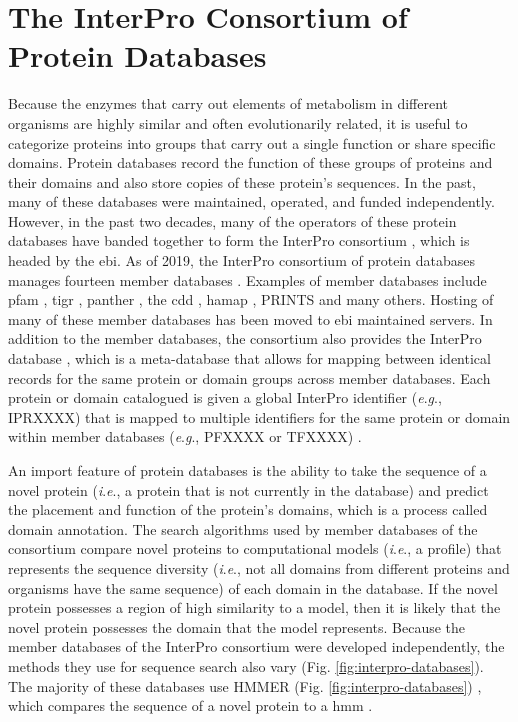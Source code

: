\section{The InterPro Consortium of Protein Databases} \label{InterProDatabases}

Because the enzymes that carry out elements of metabolism in different organisms 
are highly similar and often evolutionarily related, it is useful to categorize 
proteins into groups that carry out a single function or share specific domains. 
Protein databases record the function of these groups of proteins and their 
domains and also store copies of these protein's sequences. In the past, many of 
these databases were maintained, operated, and funded independently. However, in 
the past two decades, many of the operators of these protein databases have 
banded together to form the InterPro consortium 
\cite{apweiler2000interpro,hunter2008interpro,Hunter2009}, which is headed by 
the \gls{ebi}\cite{cook2015european,finn2016interpro}. As of 2019, the InterPro 
consortium of protein databases manages fourteen member databases 
\cite{finn2016interpro,Hunter2009}. Examples of member databases include 
\gls{pfam} \cite{bateman2004pfam}, \gls{tigr} \cite{Haft2013}, \gls{panther} 
\cite{mi2005panther}, the \gls{cdd} \cite{marchler2014cdd}, \gls{hamap} 
\cite{lima2008hamap}, PRINTS \cite{attwood2000prints} and many others. Hosting 
of many of these member databases has been moved to \gls{ebi} maintained 
servers. In addition to the member databases, the consortium also provides the 
InterPro database \cite{hunter2008interpro,finn2016interpro}, which is a 
meta-database that allows for mapping between identical records for the same 
protein or domain groups across member databases. Each protein or domain 
catalogued is given a global InterPro identifier (\textit{e}.\textit{g}., 
IPRXXXX) that is mapped to multiple identifiers for the same protein or domain 
within member databases (\textit{e}.\textit{g}., PFXXXX or TFXXXX) 
\cite{hunter2008interpro,finn2016interpro}.

An import feature of protein databases is the ability to take the sequence of a 
novel protein (\textit{i}.\textit{e}., a protein that is not currently in the database) and 
predict the placement and function of the protein's domains, which is a process called 
domain annotation. The search algorithms used by member databases of the 
consortium compare novel proteins to computational models (\textit{i}.\textit{e}., a profile) that 
represents the sequence diversity (\textit{i}.\textit{e}., not all domains from different proteins 
and organisms have the same sequence) of each domain in the database. If the 
novel protein possesses a region of high similarity to a model, then it is 
likely that the novel protein possesses the domain that the model represents. 
Because the member databases of the InterPro consortium were developed 
independently, the methods they use for sequence search also vary (Fig. 
\ref{fig:interpro-databases}). The majority of these databases use HMMER (Fig. 
\ref{fig:interpro-databases}) \cite{eddy2011accelerated}, which compares the 
sequence of a novel protein to a \gls{hmm} \cite{de2007hidden}.

